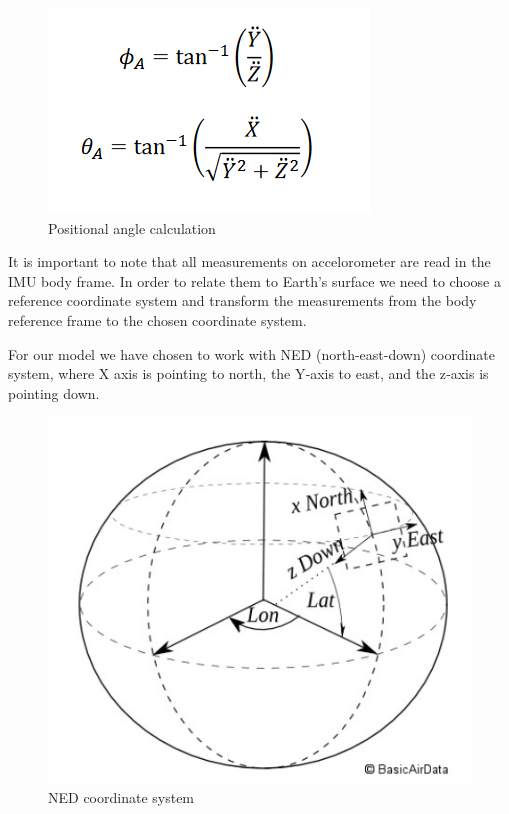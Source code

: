 \begin{figure}[H]
    \begin{center}
    \includegraphics[scale = 0.7]{pictures/IMU/Accel_angles.png}
    \end{center}
    \caption{Positional angle calculation   }
    \label{fig:my_label}
\end{figure}

It is important to note that all measurements on accelorometer are read in the IMU body frame. In order to relate them to Earth's surface we need to choose a reference coordinate system and transform the measurements from the body reference frame to the chosen coordinate system.

For our model we have chosen to work with NED (north-east-down) coordinate system, where X axis is pointing to north, the Y‐axis to east, and the z‐axis is pointing down.

\begin{figure}[H]
    \begin{center}
    \includegraphics[scale = 0.5]{pictures/IMU/NED_sys.png}
    \end{center}
    \caption{NED coordinate system }
    \label{fig:my_label}
\end{figure}

